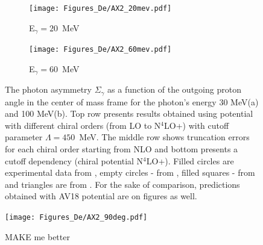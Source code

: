     \begin{figure}[h]
        \centering
        \begin{subfigure}[b]{0.46\textwidth}
            \texttt{[image: Figures\_De/AX2\_20mev.pdf]}
            \caption{\small E$_\gamma = 20$~MeV}
            \label{AX_20_vert}
        \end{subfigure}
        \begin{subfigure}[b]{0.46\textwidth}
            \texttt{[image: Figures\_De/AX2\_60mev.pdf]}
            \caption{\small E$_\gamma = 60$~MeV}
            \label{AX_60_vert}
        \end{subfigure}
        \caption{The photon asymmetry $\Sigma_\gamma$ 
        as a function of the outgoing proton angle in the center of mass frame 
        for the photon's energy 30 MeV(a) and 100 MeV(b).
        Top row presents results obtained using potential
        with different chiral orders (from LO to N$^4$LO+) with cutoff parameter $\Lambda=450$~MeV.
        The middle row shows truncation errors for each 
        chiral order starting from NLO and
        bottom presents a cutoff dependency (chiral potential N$^4$LO+).
        Filled circles are experimental data from \cite{KRAUSE1992_asymetry},
        empty circles - from \cite{depascale_asymmetry}, filled squares
        - from \cite{Barannik_asymetry} and triangles are from \cite{Vnukov_asymmetry}.
        For the sake of comparison, predictions obtained with AV18 potential are on  figures as well.}
        \label{assymetry}
    \end{figure}
     
    \begin{figure}[h]
        \begin{center}
        \texttt{[image: Figures\_De/AX2\_90deg.pdf]}
        \end{center}
        \caption{{\color{red} MAKE me better}}
        \label{asymmetry_90deg}
    \end{figure}
    
